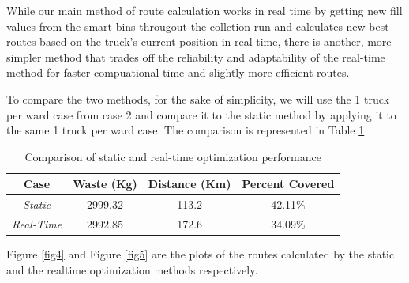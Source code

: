 \documentclass[12pt]{article}
\begin{document}
While our main method of route calculation works in real time by getting new fill values from the smart bins througout the collction run and calculates new best routes based on the truck's current position in real time, there is another, more simpler method that trades off the reliability and adaptability of the real-time method for faster compuational time and slightly more efficient routes.

To compare the two methods, for the sake of simplicity, we will use the 1 truck per ward case from case 2 and compare it to the static method by applying it to the same 1 truck per ward case. The comparison is represented in Table \ref{tab5}

\begin{table}[H]
    \centering
    \caption{Comparison of static and real-time optimization performance} \label{tab5}
    \vspace*{0.3cm}
    \begin{tabular}{|c|c|c|c|}
        \hline Case & Waste (Kg) & Distance (Km) & Percent Covered\\
        \hline \textit{Static}& 2999.32& 113.2 & 42.11\%\\
        \hline \textit{Real-Time}& 2992.85& 172.6& 34.09\%\\
        \hline
    \end{tabular}
\end{table}

Figure \ref{fig4} and Figure \ref{fig5} are the plots of the routes calculated by the static and the realtime optimization methods respectively.
\end{document}
